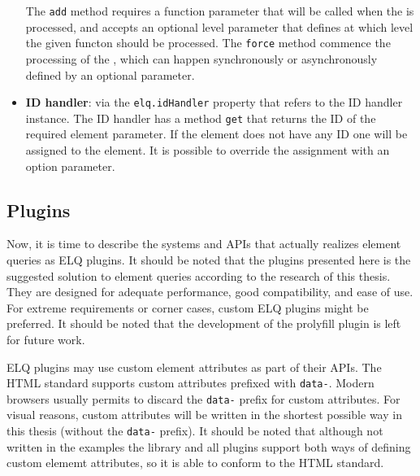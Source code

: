 \documentclass[a4paper,11pt]{kth-mag}
\newcommand{\code}[1]{\texttt{#1}}
\newcommand\abbr[2][]{\uppercase{#2}\ifthenelse{\equal{#1}{}}%
                     {}{#1}}
\begin{document}
\begin{itemize}
            The \code{add} method requires a function parameter that will be called when the  is processed, and accepts an optional level parameter that defines at which level the given functon should be processed.
            The \code{force} method commence the processing of the , which can happen synchronously or asynchronously defined by an optional parameter.
          \item
            \textbf{\abbr{ID} handler}: via the \code{elq.idHandler} property that refers to the \abbr{ID} handler instance. 
            The \abbr{ID} handler has a method \code{get} that returns the \abbr{ID} of the required element parameter.
            If the element does not have any \abbr{ID} one will be assigned to the \gls{element}.
            It is possible to override the assignment with an option parameter.
        \end{itemize}
      \subsection{Plugins}
        Now, it is time to describe the systems and \glspl{API} that actually realizes element queries as \gls{ELQ} plugins.
        It should be noted that the plugins presented here is the suggested solution to element queries according to the research of this thesis.
        They are designed for adequate performance, good compatibility, and ease of use.
        For extreme requirements or corner cases, custom \gls{ELQ} plugins might be preferred.
        It should be noted that the development of the prolyfill plugin is left for future work.

        \Gls{ELQ} plugins may use custom element attributes as part of their \glspl{API}.
        The \gls{HTML} standard supports custom attributes prefixed with \code{data-}.
        Modern \glspl{browser} usually permits to discard the \code{data-} prefix for custom attributes.
        For visual reasons, custom attributes will be written in the shortest possible way in this thesis (without the \code{data-} prefix).
        It should be noted that although not written in the examples the library and all plugins support both ways of defining custom elememt attributes, so it is able to conform to the \gls{HTML} standard.
\end{document}
